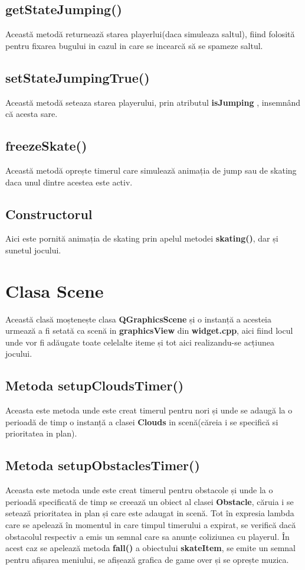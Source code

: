 \documentclass{article}
\begin{document}
\subsection{getStateJumping()}
Această metodă returnează starea playerlui(daca simuleaza saltul), fiind folosită pentru fixarea bugului in cazul in care se incearcă să se spameze saltul.

\subsection{setStateJumpingTrue()}
Această metodă seteaza starea playerului, prin atributul \textbf{isJumping} , insemnând că acesta sare.

\subsection{freezeSkate()}
Această metodă oprește timerul care simulează animația de jump sau de skating daca unul dintre acestea este activ.

\subsection{Constructorul}
Aici este pornită animația de skating prin apelul metodei \textbf{skating()}, dar și sunetul jocului.

\section{Clasa Scene}
Această clasă moștenește clasa \textbf{QGraphicsScene} și o instanță a acesteia urmează a fi setată ca scenă in \textbf{graphicsView}  din \textbf{widget.cpp}, aici fiind locul unde vor fi adăugate toate celelalte iteme și tot aici realizandu-se acțiunea jocului.
 
\subsection{Metoda setupCloudsTimer()}
Aceasta este metoda unde este creat timerul pentru nori și unde se adaugă  la o perioadă de timp o instanță a clasei \textbf{Clouds}  in scenă(căreia i se specifică si prioritatea in plan).

\subsection{Metoda setupObstaclesTimer()}
Aceasta este metoda unde este creat timerul pentru obstacole și unde la o perioadă specificată de timp se creează un obiect al clasei \textbf{Obstacle}, căruia i se setează prioritatea in plan și care este adaugat in scenă. Tot în expresia lambda care se apelează în momentul in care timpul timerului a expirat, se verifică dacă obstacolul respectiv a emis un semnal care sa anunțe coliziunea cu playerul. În acest caz se apelează metoda \textbf{fall()} a obiectului \textbf{skateItem}, se emite un semnal pentru afișarea meniului, se afișează grafica de game over și se oprește muzica.
\end{document}

